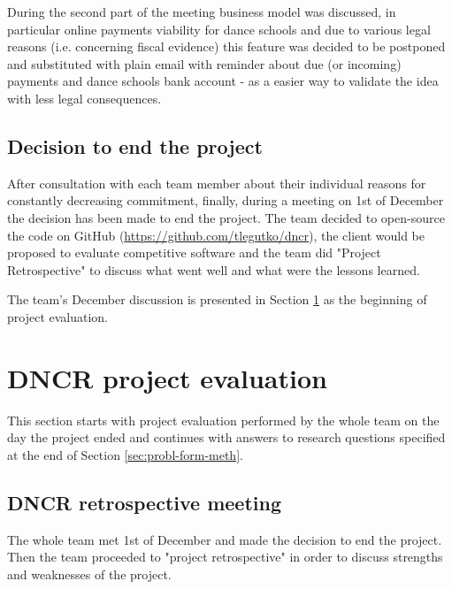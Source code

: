 \documentclass{article}
\begin{document}
During the second part of the meeting business model was discussed, in particular online payments viability for dance schools and due to various legal reasons (i.e. concerning fiscal evidence) this feature was decided to be postponed and substituted with plain email with reminder about due (or incoming) payments and dance schools bank account - as a easier way to validate the idea with less legal consequences.

\subsection{Decision to end the project}
After consultation with each team member about their individual reasons for constantly decreasing commitment, finally, during a meeting on 1st of December the decision has been made to end the project. The team decided to open-source the code on GitHub (\url{https://github.com/tlegutko/dncr}), the client would be proposed to evaluate competitive software and the team did "Project Retrospective" to discuss what went well and what were the lessons learned.

The team's December discussion is presented in Section \ref{sec:dncr-proj-eval} as the beginning of project evaluation.

\section{DNCR project evaluation}
\label{sec:dncr-proj-eval}
This section starts with project evaluation performed by the whole team on the day the project ended and continues with answers to research questions specified at the end of Section \ref{sec:probl-form-meth}.

\subsection{DNCR retrospective meeting}
The whole team met 1st of December and made the decision to end the project. Then the team proceeded to "project retrospective" in order to discuss strengths and weaknesses of the project.
\end{document}
